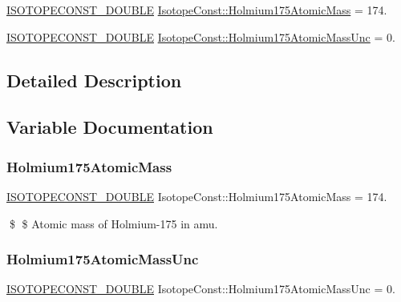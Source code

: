 \begin{DoxyCompactItemize}
\item 
\mbox{\hyperlink{group___isotope_const-_macros_ga8f45a7272ce02c0b4c65c44636ed719a}{I\+S\+O\+T\+O\+P\+E\+C\+O\+N\+S\+T\+\_\+\+D\+O\+U\+B\+LE}} \mbox{\hyperlink{group___isotope_const-_holmium-_ho175_ga3c2557ae391642c25e670eaa1cd63511}{Isotope\+Const\+::\+Holmium175\+Atomic\+Mass}} = 174.
\item 
\mbox{\hyperlink{group___isotope_const-_macros_ga8f45a7272ce02c0b4c65c44636ed719a}{I\+S\+O\+T\+O\+P\+E\+C\+O\+N\+S\+T\+\_\+\+D\+O\+U\+B\+LE}} \mbox{\hyperlink{group___isotope_const-_holmium-_ho175_gadf55e426f661c7c082cab604f8a110a4}{Isotope\+Const\+::\+Holmium175\+Atomic\+Mass\+Unc}} = 0.
\end{DoxyCompactItemize}


\subsection{Detailed Description}


\subsection{Variable Documentation}
\mbox{\label{group___isotope_const-_holmium-_ho175_ga3c2557ae391642c25e670eaa1cd63511}} 
\subsubsection{\texorpdfstring{Holmium175\+Atomic\+Mass}{Holmium175AtomicMass}}
{\footnotesize\ttfamily \mbox{\hyperlink{group___isotope_const-_macros_ga8f45a7272ce02c0b4c65c44636ed719a}{I\+S\+O\+T\+O\+P\+E\+C\+O\+N\+S\+T\+\_\+\+D\+O\+U\+B\+LE}} Isotope\+Const\+::\+Holmium175\+Atomic\+Mass = 174.}

\$ \$ Atomic mass of Holmium-\/175 in amu. \mbox{\label{group___isotope_const-_holmium-_ho175_gadf55e426f661c7c082cab604f8a110a4}} 
\subsubsection{\texorpdfstring{Holmium175\+Atomic\+Mass\+Unc}{Holmium175AtomicMassUnc}}
{\footnotesize\ttfamily \mbox{\hyperlink{group___isotope_const-_macros_ga8f45a7272ce02c0b4c65c44636ed719a}{I\+S\+O\+T\+O\+P\+E\+C\+O\+N\+S\+T\+\_\+\+D\+O\+U\+B\+LE}} Isotope\+Const\+::\+Holmium175\+Atomic\+Mass\+Unc = 0.}


